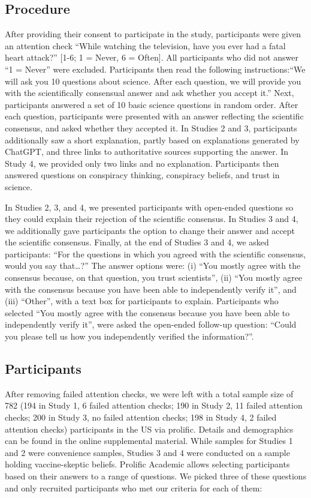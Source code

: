 \documentclass[
  doc,floatsintext]{apa6}
\begin{document}
\subsection{Procedure}\label{procedure}

After providing their consent to participate in the study, participants were given an attention check ``While watching the television, have you ever had a fatal heart attack?'' {[}1-6; 1 = Never, 6 = Often{]}. All participants who did not answer ``1 = Never'' were excluded. Participants then read the following instructions:``We will ask you 10 questions about science. After each question, we will provide you with the scientifically consensual answer and ask whether you accept it.'' Next, participants answered a set of 10 basic science questions in random order. After each question, participants were presented with an answer reflecting the scientific consensus, and asked whether they accepted it. In Studies 2 and 3, participants additionally saw a short explanation, partly based on explanations generated by ChatGPT, and three links to authoritative sources supporting the answer. In Study 4, we provided only two links and no explanation. Participants then answered questions on conspiracy thinking, conspiracy beliefs, and trust in science.

In Studies 2, 3, and 4, we presented participants with open-ended questions so they could explain their rejection of the scientific consensus. In Studies 3 and 4, we additionally gave participants the option to change their answer and accept the scientific consensus. Finally, at the end of Studies 3 and 4, we asked participants: ``For the questions in which you agreed with the scientific consensus, would you say that\ldots?'' The answer options were: (i) ``You mostly agree with the consensus because, on that question, you trust scientists'', (ii) ``You mostly agree with the consensus because you have been able to independently verify it'', and (iii) ``Other'', with a text box for participants to explain. Participants who selected ``You mostly agree with the consensus because you have been able to independently verify it'', were asked the open-ended follow-up question: ``Could you please tell us how you independently verified the information?''.

\subsection{Participants}\label{participants}

After removing failed attention checks, we were left with a total sample size of 782 (194 in Study 1, 6 failed attention checks; 190 in Study 2, 11 failed attention checks; 200 in Study 3, no failed attention checks; 198 in Study 4, 2 failed attention checks) participants in the US via prolific. Details and demographics can be found in the online supplemental material. While samples for Studies 1 and 2 were convenience samples, Studies 3 and 4 were conducted on a sample holding vaccine-skeptic beliefs. Prolific Academic allows selecting participants based on their answers to a range of questions. We picked three of these questions and only recruited participants who met our criteria for each of them:
\end{document}
